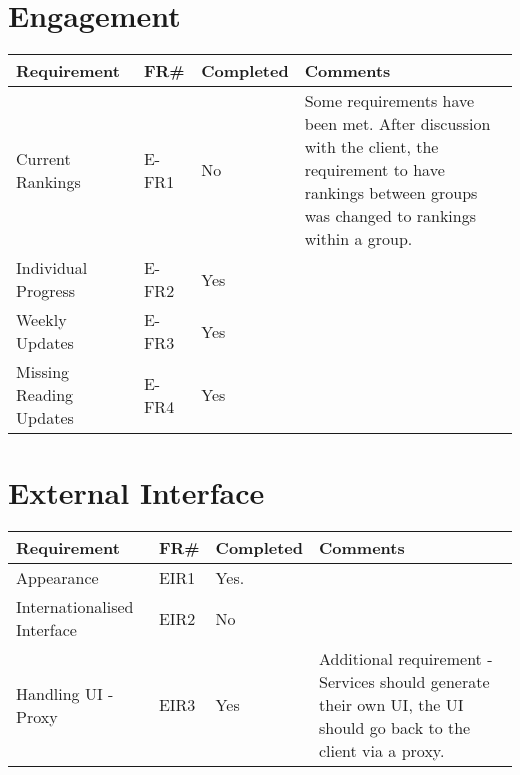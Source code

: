 \section{Engagement}
\begin{tabular}{ |p{5cm}|l|l|p{8cm}|}
\hline
\textbf{Requirement}	&	\textbf{FR\#}	&	\textbf{Completed}	&	\textbf{Comments} \\
\hline
Current Rankings 									& E-FR1		& No	& Some requirements have been met. After discussion with the client, the requirement to have rankings between groups was changed to rankings within a group.  \\
\hline
Individual Progress									& E-FR2		& Yes	&  \\
\hline
Weekly Updates 										& E-FR3		& Yes	&  \\
\hline
Missing Reading Updates 							& E-FR4		& Yes	&  \\

\hline
\end{tabular}


\section{External Interface}
\begin{tabular}{ |p{5cm}|l|l|p{8cm}|}
\hline
\textbf{Requirement}	&	\textbf{FR\#}	&	\textbf{Completed}	&	\textbf{Comments} \\
\hline
Appearance & EIR1 & Yes. &  \\
\hline
Internationalised Interface & EIR2 & No &  \\
\hline
Handling UI - Proxy & EIR3 & Yes & Additional requirement - Services should generate their own UI, the UI should go back to the client via a proxy. \\
\hline
\end{tabular}
